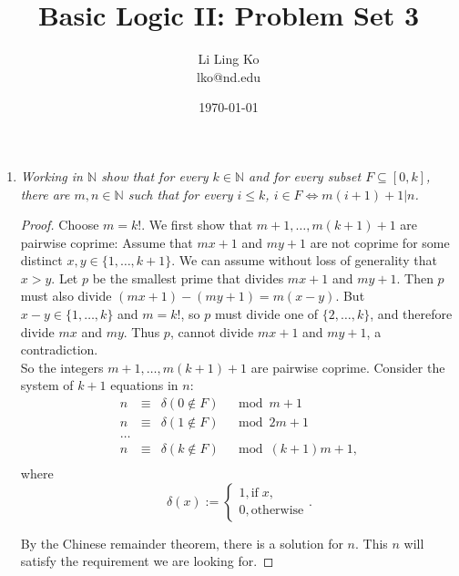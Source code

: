 \documentclass{article}
\begin{document}
\title{Basic Logic II: Problem Set 3}
\author{Li Ling Ko\\ lko@nd.edu}
\date{\today}
\maketitle

\begin{enumerate}[label={\bf Q\arabic*:}]
  \item \it Working in $\mathbb{N}$ show that for every $k\in\mathbb{N}$ and
    for every subset $F\subseteq[0,k]$, there are $m,n\in\mathbb{N}$ such
    that for every $i\leq k$, $i\in F \Leftrightarrow m(i+1)+1|n$.

    \begin{proof}
      Choose $m=k!$. We first show that $m+1,\ldots,m(k+1)+1$ are pairwise
      coprime: Assume that $mx+1$ and $my+1$ are not coprime for some
      distinct $x,y\in\{1,\ldots,k+1\}$. We can assume without loss of
      generality that $x>y$. Let $p$ be the smallest prime that divides
      $mx+1$ and $my+1$. Then $p$ must also divide $(mx+1)-(my+1)=m(x-y)$.
      But $x-y\in\{1,\ldots,k\}$ and $m=k!$, so $p$ must divide one of
      $\{2,\ldots,k\}$, and therefore divide $mx$ and $my$. Thus $p$,
      cannot divide $mx+1$ and $my+1$, a contradiction. \\

      So the integers $m+1,\ldots,m(k+1)+1$ are pairwise coprime. Consider
      the system of $k+1$ equations in $n$:
      \[\begin{array}{llll}
        n &\equiv &\delta(0\not\in F) &\mod{m+1}\\
        n &\equiv &\delta(1\not\in F) &\mod{2m+1}\\
        \ldots &&&\\
        n &\equiv &\delta(k\not\in F) &\mod{(k+1)m+1},\\
      \end{array}\]
      where
      \[\delta(x)
      :=\begin{cases}1,\text{if}\;x,\\0,\text{otherwise}\end{cases}.\]

      By the Chinese remainder theorem, there is a solution for $n$. This
      $n$ will satisfy the requirement we are looking for.
    \end{proof}
\end{enumerate}
\end{document}
